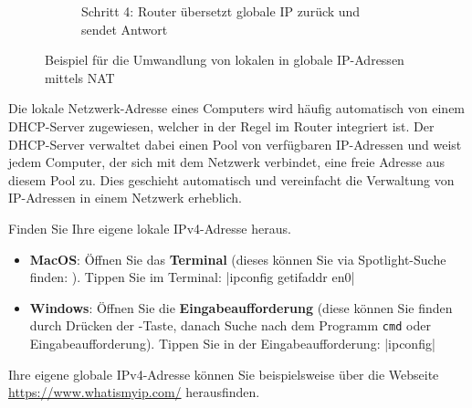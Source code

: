 \begin{figure}[H]
\begin{subfigure}[b]{\textwidth}
		\caption{Schritt 4: Router übersetzt globale IP zurück und sendet Antwort}
	\end{subfigure}

	\caption{Beispiel für die Umwandlung von lokalen in globale \gls{IP}-Adressen mittels \gls{NAT}}
	\label{fig:nat-example}
\end{figure}

Die lokale Netzwerk-Adresse eines Computers wird häufig automatisch von einem \gls{DHCP}-Server zugewiesen, welcher in der Regel im Router integriert ist. Der \gls{DHCP}-Server verwaltet dabei einen Pool von verfügbaren \gls{IP}-Adressen und weist jedem Computer, der sich mit dem Netzwerk verbindet, eine freie Adresse aus diesem Pool zu. Dies geschieht automatisch und vereinfacht die Verwaltung von \gls{IP}-Adressen in einem Netzwerk erheblich.

\begin{myexercise}\label{ex:meine-ip}
	Finden Sie Ihre eigene lokale \gls{IP}v4-Adresse heraus.
	\begin{itemize}
		\item[\faApple] \textbf{MacOS}: Öffnen Sie das \textbf{Terminal} (dieses können Sie via Spotlight-Suche finden: \keys{\cmd + \SPACE}). Tippen Sie im Terminal: \commandbox*|ipconfig getifaddr en0|
		\item[\faWindows] \textbf{Windows}: Öffnen Sie die \textbf{Eingabeaufforderung} (diese können Sie finden durch Drücken der \keys{\faWindows}-Taste, danach Suche nach dem Programm \texttt{cmd} oder Eingabeaufforderung). Tippen Sie in der Eingabeaufforderung: \commandbox*|ipconfig|
	\end{itemize}
	Ihre eigene globale \gls{IP}v4-Adresse können Sie beispielsweise über die Webseite \url{https://www.whatismyip.com/} herausfinden.
\end{myexercise}

